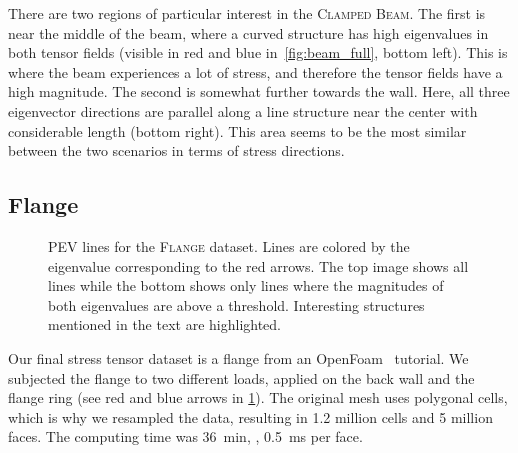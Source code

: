 %
%

%
There are two regions of particular interest in the \textsc{Clamped Beam}.
%
The first is near the middle of the beam, where a curved structure has high
eigenvalues in both tensor fields (visible in red and blue
in~\cref{fig:beam_full}, bottom left).
%
This is where the beam experiences a lot of stress, and therefore the tensor
fields have a high magnitude.
%
The second is somewhat further towards the wall.
%
Here, all three eigenvector directions are parallel along a line structure near
the center with considerable length (bottom right).
%
This area seems to be the most similar between the two scenarios in terms of
stress directions.
%
%
\subsection{Flange} %
\label{ssub:flange}
%
\begin{figure}[p]
    \setlength\figurewidth\textwidth
    \centering
    
    \caption{\ac{PEV} lines for the \textsc{Flange} dataset. Lines are colored
             by the eigenvalue corresponding to the red arrows. The top image
             shows all lines while the bottom shows only lines where the
             magnitudes of both eigenvalues are above a threshold. Interesting
             structures mentioned in the text are highlighted.}
    \label{fig:flange_filtered}
\end{figure}
%
%
%
%
%
Our final stress tensor dataset is a flange from an OpenFoam~\cite{OpenFOAMWWW}
tutorial.
%
We subjected the flange to two different loads, applied on the back wall and the
flange ring (see red and blue arrows in \cref{fig:flange_filtered}).
%
The original mesh uses polygonal cells, which is why we resampled the data,
resulting in \num{1.2} million cells and \num{5} million faces.
%
The computing time was \SI{36}{\minute}, \ie{}, \SI{0.5}{\milli\second} per face.
%

